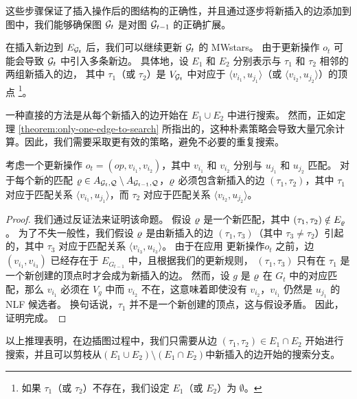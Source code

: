 这些步骤保证了插入操作后的图结构的正确性，并且通过逐步将新插入的边添加到图中，我们能够确保图 $\mathcal{G}_t$ 是对图 $\mathcal{G}_{t-1}$ 的正确扩展。

在插入新边到 $E_{\mathcal{G}_t}$ 后，我们可以继续更新 $\mathcal{G}_t$ 的 MWstars。
由于更新操作 $o_t$ 可能会导致 $\mathcal{G}_t$ 中引入多条新边。
具体地，设 $E_1$ 和 $E_2$ 分别表示与 $\tau_1$ 和 $\tau_2$ 相邻的两组新插入的边，
其中 $\tau_1$（或 $\tau_2$）是 $V_{\mathcal{G}_t}$ 中对应于 $\langle v_{i_1}, u_{j_1} \rangle$（或 $\langle v_{i_2}, u_{j_2} \rangle$）的顶点
\footnote{如果 $\tau_1$（或 $\tau_2$）不存在，我们设定 $E_1$（或 $E_2$）为 $\emptyset$。}。

一种直接的方法是从每个新插入的边开始在 $E_1 \cup E_2$ 中进行搜索。
然而，正如定理 \ref{theorem:only-one-edge-to-search} 所指出的，这种朴素策略会导致大量冗余计算。因此，我们需要采取更有效的策略，避免不必要的重复搜索。

\begin{theorem} \label{theorem:only-one-edge-to-search}
    考虑一个更新操作 $o_t = (op, v_{i_1}, v_{i_2})$，其中 $v_{i_1}$ 和 $v_{i_2}$ 分别与 $u_{j_1}$ 和 $u_{j_2}$ 匹配。
    对于每个新的匹配 $\varrho \in A_{\mathcal{G}_t, \mathcal{Q}} \setminus A_{\mathcal{G}_{t-1}, \mathcal{Q}}$，$\varrho$ 必须包含新插入的边 $(\tau_1, \tau_2)$，其中 $\tau_1$ 对应于匹配关系 $\langle v_{i_1}, u_{j_1} \rangle$，而 $\tau_2$ 对应于匹配关系 $\langle v_{i_2}, u_{j_2} \rangle$。
\end{theorem}

\begin{proof}
    我们通过反证法来证明该命题。
    假设 $\varrho$ 是一个新匹配，其中 $(\tau_1, \tau_2) \notin E_{\varrho}$。
    为了不失一般性，我们假设 $\varrho$ 是由新插入的边 $(\tau_1, \tau_3)$（其中 $\tau_3 \neq \tau_2$）引起的，其中 $\tau_3$ 对应于匹配关系 $\langle v_{i_3}, u_{i_3} \rangle$。
    由于在应用 更新操作$o_t$ 之前，边 $(v_{i_1}, v_{i_3})$ 已经存在于 $E_{G_{t-1}}$ 中，且根据我们的更新规则，
    $(\tau_1, \tau_3)$ 只有在 $\tau_1$ 是一个新创建的顶点时才会成为新插入的边。
    然而，设 $g$ 是 $\varrho$ 在 $G_t$ 中的对应匹配，那么 $v_{i_1}$ 必须在 $V_g$ 中而 $v_{i_2}$ 不在，这意味着即使没有 $v_{i_2}$，$v_{i_1}$ 仍然是 $u_{j_1}$ 的 NLF 候选者。
    换句话说，$\tau_1$ 并不是一个新创建的顶点，这与假设矛盾。
    因此，证明完成。
\end{proof}

以上推理表明，在边插图过程中，我们只需要从边 $(\tau_1, \tau_2) \in E_1 \cap E_2$ 开始进行搜索，并且可以剪枝从$(E_1 \cup E_2) \setminus (E_1 \cap E_2)$中新插入的边开始的搜索分支。


